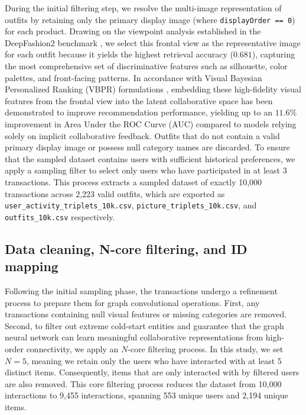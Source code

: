 During the initial filtering step, we resolve the multi-image representation of outfits by retaining only the primary display image (where \texttt{displayOrder == 0}) for each product. Drawing on the viewpoint analysis established in the DeepFashion2 benchmark \parencite{ge2019deepfashion2versatilebenchmarkdetection}, we select this frontal view as the representative image for each outfit because it yields the highest retrieval accuracy ($0.681$), capturing the most comprehensive set of discriminative features such as silhouette, color palettes, and front-facing patterns. In accordance with Visual Bayesian Personalized Ranking (VBPR) formulations \parencite{he2015vbprvisualbayesianpersonalized}, embedding these high-fidelity visual features from the frontal view into the latent collaborative space has been demonstrated to improve recommendation performance, yielding up to an $11.6\%$ improvement in Area Under the ROC Curve (AUC) compared to models relying solely on implicit collaborative feedback. Outfits that do not contain a valid primary display image or possess null category names are discarded. To ensure that the sampled dataset contains users with sufficient historical preferences, we apply a sampling filter to select only users who have participated in at least 3 transactions. This process extracts a sampled dataset of exactly 10,000 transactions across 2,223 valid outfits, which are exported as \texttt{user\_activity\_triplets\_10k.csv}, \texttt{picture\_triplets\_10k.csv}, and \texttt{outfits\_10k.csv} respectively.

\subsection{Data cleaning, N-core filtering, and ID mapping}

Following the initial sampling phase, the transactions undergo a refinement process to prepare them for graph convolutional operations. First, any transactions containing null visual features or missing categories are removed. Second, to filter out extreme cold-start entities and guarantee that the graph neural network can learn meaningful collaborative representations from high-order connectivity, we apply an $N$-core filtering process. In this study, we set $N=5$, meaning we retain only the users who have interacted with at least 5 distinct items. Consequently, items that are only interacted with by filtered users are also removed. This core filtering process reduces the dataset from 10,000 interactions to 9,455 interactions, spanning 553 unique users and 2,194 unique items.

